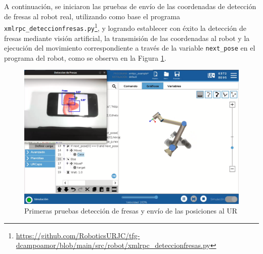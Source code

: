 A continuación, se iniciaron las pruebas de envío de las coordenadas de detección de fresas al robot real, utilizando como base el programa \verb|xmlrpc_deteccionfresas.py|\footnote{\url{https://github.com/RoboticsURJC/tfg-dcampoamor/blob/main/src/robot/xmlrpc_deteccionfresas.py}}, y logrando establecer con éxito la detección de fresas mediante visión artificial, la transmisión de las coordenadas al robot y la ejecución del movimiento correspondiente a través de la variable \texttt{next\_pose} en el programa del robot, como se observa en la Figura \ref{fig:primeraspruebas_fresas_UR}.

  \begin{figure}[H]
     \centering
     \begin{center}
       \includegraphics[width=155mm]{figs/Primeras pruebas deteccion de fresas y envio de posiciones a UR.png}
     \end{center}
     \caption{Primeras pruebas detección de fresas y envío de las posiciones al UR}
     \label{fig:primeraspruebas_fresas_UR}
  \end{figure}

